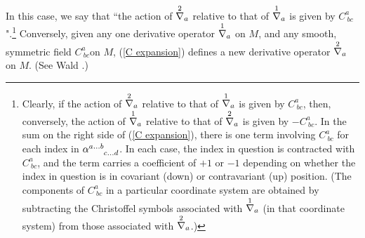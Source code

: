 \documentclass [12] {article}
\theoremstyle{plain}
\numberwithin{figure}{subsection}
\numberwithin{proposition}{subsection}
\begin{document}
In this case, we say that ``the action of $\stackrel{2 \hspace{.5em}}{\nabla_a}$ relative to that of $\stackrel{1 \hspace{.5em}}{\nabla_a}$ is given by $C^a_{\ bc}$".\footnote{Clearly, if the action of $\stackrel{2 \hspace{.5em}}{\nabla_a}$ relative to that of $\stackrel{1 \hspace{.5em}}{\nabla_a}$ is given by $C^a_{\ bc}$, then, conversely, the action of $\stackrel{1 \hspace{.5em}}{\nabla_a}$ relative to that of $\stackrel{2 \hspace{.5em}}{\nabla_a}$ is given by $-C^a_{\ bc}$.
In the sum on the right side of (\ref{C expansion}),  there is one term involving $C^a_{\ bc}$  for each index in $\alpha^{a \ldots b}_{\hspace{1.5em} c \ldots d}$. In each case, the index in question is contracted with $C^a_{\ bc}$, and the term carries a coefficient of $+1$ or $-1$ depending on whether the index in question is in covariant (down) or contravariant (up) position.  (The components of $C^a_{\ bc}$ in a particular coordinate system are obtained by subtracting the Christoffel symbols associated with $\stackrel{1 \hspace{.5em}}{\nabla_a}$ (in that coordinate system) from those associated with $\stackrel{2 \hspace{.5em}}{\nabla_a}$.)} Conversely, given any one derivative operator $\stackrel{1 \hspace{.5em}}{\nabla_a}$  on $M$,  and any smooth, symmetric field $C^a_{\ bc}$on $M$, (\ref{C expansion}) defines a new derivative operator $\stackrel{2 \hspace{.5em}}{\nabla_a}$ on $M$. (See Wald .)
%
\end{document}
